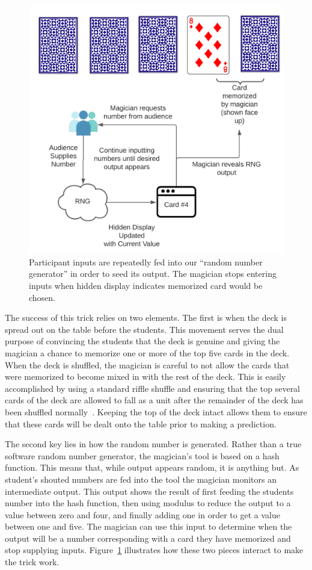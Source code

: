 \begin{figure}[H]
\centering
\includegraphics[scale=.6]{images/Trick3}
\caption{Participant inputs are repeatedly fed into our ``random number
generator'' in order to seed its output.  The magician stops entering inputs
when hidden display indicates memorized card would be chosen.}
\label{fig:trick3}
\end{figure}

The success of this trick relies on two elements.
The first is when the deck is spread out on the
table before the students.  This movement serves the dual purpose of convincing
the students that the deck is genuine and giving the magician a chance to
memorize one or more of the top five cards in the deck.
When the deck is
shuffled, the magician is careful to not allow the cards that were memorized to
become mixed in with the rest of the deck.  This is easily accomplished by
using a standard riffle shuffle and ensuring that the top several cards of
the deck are allowed to fall as a unit after the remainder of the deck has
been shuffled normally~\cite{wikishuffle}.
Keeping the top of the deck intact allows them to ensure that
these cards will be dealt onto the table prior to making a prediction.


The second key lies in how the random number is generated.
Rather than
a true software random number generator, the magician's tool is based on a hash
function.  This means that, while output appears random, it is anything but.
As student's shouted numbers are fed into the tool the magician monitors an
intermediate output.
This output shows the result of first feeding the students number
into the hash function, then using modulus to reduce the output to a value
between zero and four, and finally adding one in order to get a value between
one and five.
The magician can use this input to determine when the output will be a number
corresponding with a card they have memorized and stop supplying inputs.
Figure~\ref{fig:trick3} illustrates how these two pieces interact to make
the trick work.


